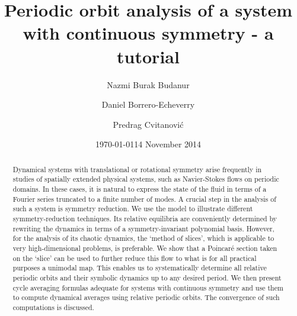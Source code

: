 \documentclass[aip,cha,
reprint,
secnumarabic,
nofootinbib, tightenlines,
nobibnotes, showkeys, showpacs,
superscriptaddress,
]{revtex4-1}
\begin{document}
\title[Periodic orbit analysis of a system with continuous symmetry]
{Periodic orbit analysis of a system with continuous symmetry - a tutorial}

\author{Nazmi Burak Budanur}
\author{Daniel Borrero-Echeverry}
\author{Predrag Cvitanovi\'{c}}
    \ifdraft
\date{\today}
    \else
\date{14 November 2014}
   \fi

\begin{abstract}
Dynamical systems with translational or rotational symmetry arise
frequently in studies of spatially extended physical systems, such as
Navier-Stokes flows on periodic domains. In these cases, it is natural to
express the state of the fluid in terms of a Fourier series truncated to a
finite number of modes.
A crucial step in the analysis of such a system
is symmetry reduction. We use the model to illustrate different
symmetry-reduction techniques. Its relative equilibria are conveniently
determined by rewriting the dynamics in terms of a symmetry-invariant
polynomial basis. However, for the analysis of its chaotic dynamics, the `method of
slices', which is applicable to very high-dimensional problems, is
preferable. We show that a Poincar\'e section taken on the `slice' can be
used to further reduce this flow to what is for all practical purposes a
unimodal map. This enables us to systematically determine all relative
periodic orbits and their symbolic dynamics up to any desired period. We
then present cycle averaging formulas adequate for systems with continuous symmetry
and use them to compute dynamical averages using relative periodic orbits. The convergence
of such computations is discussed.
\end{abstract}

\maketitle
\end{document}
